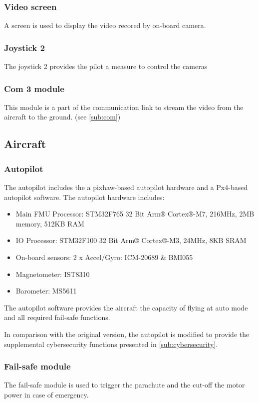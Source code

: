 \documentclass[]{article}
\begin{document}
\subsubsection {Video screen}
A screen is used to display the video recored by on-board camera.
\subsubsection{Joystick 2}
The joystick 2 provides the pilot a measure to control the cameras
\subsubsection{Com 3 module}
This module is a part of the communication link to stream the video from the aircraft to the ground. (see \ref{sub:com})
\subsection{Aircraft}
\subsubsection{Autopilot}
The autopilot includes the a pixhaw-based autopilot hardware and a Px4-based autopilot software. 
The autopilot hardware includes:
 \begin{itemize}
 	\item Main FMU Processor: STM32F765 32 Bit Arm® Cortex®-M7, 216MHz, 2MB memory, 512KB RAM
 	\item IO Processor: STM32F100 32 Bit Arm® Cortex®-M3, 24MHz, 8KB SRAM
 	\item On-board sensors:  2 x Accel/Gyro: ICM-20689 \& BMI055
 	\item Magnetometer: IST8310
 	\item Barometer: MS5611
 \end{itemize}

The autopilot software provides the aircraft the capacity of flying at auto mode and all required fail-safe functions.

In comparison with the original version, the autopilot is modified to provide the supplemental cybersecurity functions presented in \ref{sub:cybersecurity}.

\subsubsection{Fail-safe module}
The fail-safe module is used to trigger the parachute and the cut-off the motor power in case of emergency.
\end{document}
